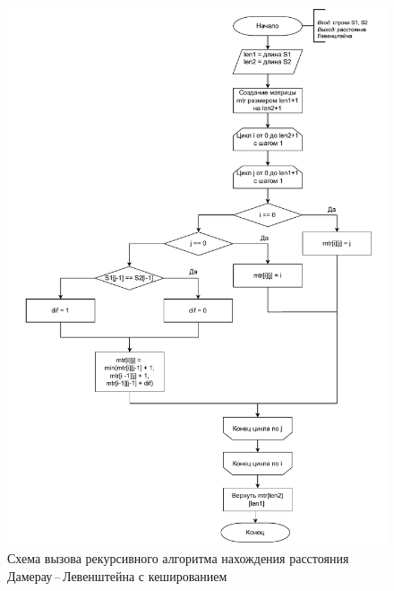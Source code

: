 \begin{figure}[h]
	\centering
	\includegraphics[height=0.9\textheight, page=4]{img/algorithms.pdf}
	\caption{Схема вызова рекурсивного алгоритма нахождения расстояния Дамерау\,--\,Левенштейна с кешированием}
	\label{fig:DLrechashDecor}
\end{figure}


